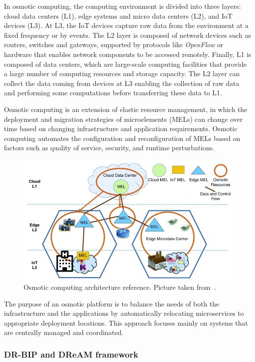 In osmotic computing, the computing environment is divided into three layers: cloud data centers (L1), edge systems and micro data centers (L2), and
IoT devices (L3).
At L3, the IoT devices capture raw data from the environment at a fixed frequency or by events. The L2 layer is composed of network devices such as
routers, switches and gateways, supported by protocols like \emph{OpenFlow} or hardware that enables network components to be accessed remotely.
Finally, L1 is composed of data centers, which are large-scale computing facilities that provide a large number of computing resources and storage
capacity.
The L2 layer can collect the data coming from devices at L3 enabling the collection of raw data and performing some computations before transferring
these data to L1.

Osmotic computing is an extension of elastic resource management, in which the deployment and migration strategies of microelements (MELs) can change
over time based on changing infrastructure and application requirements. Osmotic computing automates the configuration and reconfiguration of MELs
based on factors such as quality of service, security, and runtime perturbations.

\begin{figure}
	\centering
	\includegraphics[width=0.8\linewidth]{figures/osmotic-architecture.png}
	\caption{Osmotic computing architecture reference. Picture taken from~\Cite{8781958}.}
	\label{fig:osmotic-computing}
\end{figure}

The purpose of an osmotic platform is to balance the needs of both the infrastructure and the applications by automatically relocating microservices
to appropriate deployment locations. This approach focuses mainly on systems that are centrally managed and coordinated.

\subsubsection{DR-BIP and DReAM framework}

